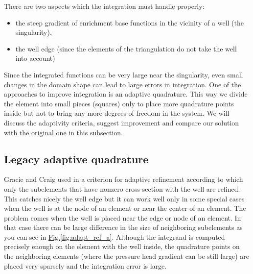 \documentclass[preprint,12pt]{elsarticle}
\newcommand{\fig}[1]{\hyperref[#1]{Fig.\ref{#1}}}
\newcommand{\notePE}[1]{{\color{Orange} \textbf{PE: } \textit{#1}}}
\begin{document}
There are two aspects which the integration must handle properly:
\begin{itemize}
  \item the steep gradient of enrichment base functions in the vicinity of a well (the singularity),
  \item the well edge (since the elements of the triangulation do not take the well into account)
\end{itemize}

Since the integrated functions can be very large near the singularity, even small changes in the domain shape 
can lead to large errors in integration.
One of the approaches to improve integration is an adaptive quadrature. This way we divide the element into 
small pieces (squares) only to place more quadrature points inside but not to bring any more degrees of freedom 
in the system. We will discuss the adaptivity criteria, suggest improvement and compare our solution
with the original one in this subsection. 

\subsection{Legacy adaptive quadrature}
\label{sec:refinement_element}
Gracie and Craig used in \cite{gracie} a criterion for adaptive refinement according to which only the subelements 
that have nonzero cross-section with the well are refined. This catches nicely the well edge but it can work 
well only in some special cases when the well is at the node of an element or near the center of an element. 
The problem comes when the well is placed near the edge or node of an element. In that case there can be
large difference in the size of neighboring subelements as you can see in \fig{fig:adapt_ref_a}. Although
the integrand is computed precisely enough on the element with the well inside, the quadrature points on the
neighboring elements (where the pressure head gradient can be still large) are placed very sparsely 
and the integration error is large.
\end{document}
